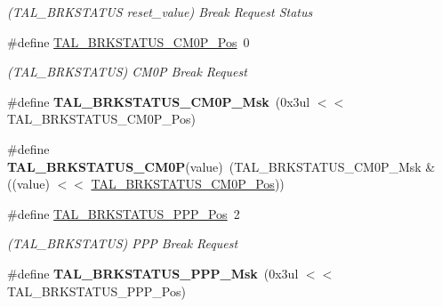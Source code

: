 \begin{DoxyCompactItemize}
\begin{DoxyCompactList}\small\item\em (T\+A\+L\+\_\+\+B\+R\+K\+S\+T\+A\+T\+U\+S reset\+\_\+value) Break Request Status \end{DoxyCompactList}\item 
\hypertarget{group___s_a_m_l21___t_a_l_ga0edd570f57bc1eeaeb2fa0cfa38efc56}{}\#define \hyperlink{group___s_a_m_l21___t_a_l_ga0edd570f57bc1eeaeb2fa0cfa38efc56}{T\+A\+L\+\_\+\+B\+R\+K\+S\+T\+A\+T\+U\+S\+\_\+\+C\+M0\+P\+\_\+\+Pos}~0\label{group___s_a_m_l21___t_a_l_ga0edd570f57bc1eeaeb2fa0cfa38efc56}

\begin{DoxyCompactList}\small\item\em (T\+A\+L\+\_\+\+B\+R\+K\+S\+T\+A\+T\+U\+S) C\+M0\+P Break Request \end{DoxyCompactList}\item 
\hypertarget{group___s_a_m_l21___t_a_l_ga55f7c69a646d0ceef83a4ee7378c54de}{}\#define {\bfseries T\+A\+L\+\_\+\+B\+R\+K\+S\+T\+A\+T\+U\+S\+\_\+\+C\+M0\+P\+\_\+\+Msk}~(0x3ul $<$$<$ T\+A\+L\+\_\+\+B\+R\+K\+S\+T\+A\+T\+U\+S\+\_\+\+C\+M0\+P\+\_\+\+Pos)\label{group___s_a_m_l21___t_a_l_ga55f7c69a646d0ceef83a4ee7378c54de}

\item 
\hypertarget{group___s_a_m_l21___t_a_l_ga1c934a8bfd42fe594a23e163a1e365d9}{}\#define {\bfseries T\+A\+L\+\_\+\+B\+R\+K\+S\+T\+A\+T\+U\+S\+\_\+\+C\+M0\+P}(value)~(T\+A\+L\+\_\+\+B\+R\+K\+S\+T\+A\+T\+U\+S\+\_\+\+C\+M0\+P\+\_\+\+Msk \& ((value) $<$$<$ \hyperlink{group___s_a_m_l21___t_a_l_ga0edd570f57bc1eeaeb2fa0cfa38efc56}{T\+A\+L\+\_\+\+B\+R\+K\+S\+T\+A\+T\+U\+S\+\_\+\+C\+M0\+P\+\_\+\+Pos}))\label{group___s_a_m_l21___t_a_l_ga1c934a8bfd42fe594a23e163a1e365d9}

\item 
\hypertarget{group___s_a_m_l21___t_a_l_ga621478431fba0c6cb259c35994bcd674}{}\#define \hyperlink{group___s_a_m_l21___t_a_l_ga621478431fba0c6cb259c35994bcd674}{T\+A\+L\+\_\+\+B\+R\+K\+S\+T\+A\+T\+U\+S\+\_\+\+P\+P\+P\+\_\+\+Pos}~2\label{group___s_a_m_l21___t_a_l_ga621478431fba0c6cb259c35994bcd674}

\begin{DoxyCompactList}\small\item\em (T\+A\+L\+\_\+\+B\+R\+K\+S\+T\+A\+T\+U\+S) P\+P\+P Break Request \end{DoxyCompactList}\item 
\hypertarget{group___s_a_m_l21___t_a_l_ga02d9bdaadc4014058b11ea61cfc3ca72}{}\#define {\bfseries T\+A\+L\+\_\+\+B\+R\+K\+S\+T\+A\+T\+U\+S\+\_\+\+P\+P\+P\+\_\+\+Msk}~(0x3ul $<$$<$ T\+A\+L\+\_\+\+B\+R\+K\+S\+T\+A\+T\+U\+S\+\_\+\+P\+P\+P\+\_\+\+Pos)\label{group___s_a_m_l21___t_a_l_ga02d9bdaadc4014058b11ea61cfc3ca72}


\end{DoxyCompactItemize}
